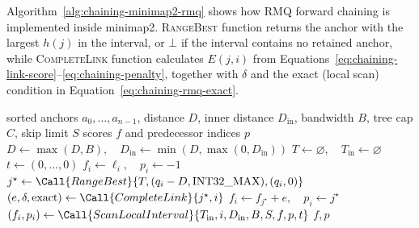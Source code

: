 Algorithm~\ref{alg:chaining-minimap2-rmq} shows how RMQ forward chaining is implemented inside minimap2.
\textsc{RangeBest} function returns the anchor with the largest \(h(j)\) in the
interval, or \(\bot\) if the interval contains no retained anchor, while \textsc{CompleteLink} function calculates \(E(j,i)\) from
Equations~\ref{eq:chaining-link-score}--\ref{eq:chaining-penalty}, together
with \(\delta\) and the exact (local scan) condition in
Equation~\ref{eq:chaining-rmq-exact}.

\begin{algorithm}[H]
\caption{Minimap2 RMQ forward chaining}
\label{alg:chaining-minimap2-rmq}
\footnotesize
\begin{algorithmic}[1]
  \Require sorted anchors \(a_0,\ldots,a_{n-1}\), distance \(D\),
    inner distance \(D_{\mathrm{in}}\), bandwidth \(B\), tree cap \(C\),
    skip limit \(S\)
  \Ensure scores \(f\) and predecessor indices \(p\)
    \State \(D\gets\max(D,B),\quad
      D_{\mathrm{in}}\gets\min(D,\max(0,D_{\mathrm{in}}))\)
    \State \(T\gets\varnothing,\quad T_{\mathrm{in}}\gets\varnothing\)
    \State \(t\gets(0,\ldots,0)\)
      \State {}
        \State {}
      \EndIf
      \State {}
        \State {}
      \EndIf
      \State \(f_i\gets\ell_i,\quad p_i\gets-1\)
      \State \(j^\star\gets
        \Call{RangeBest}{T,(q_i-D,\mathrm{INT32\_MAX}),(q_i,0)}\)
        \State \((e,\delta,\mathrm{exact})\gets
          \Call{CompleteLink}{j^\star,i}\)
          \State \(f_i\gets f_{j^\star}+e,\quad p_i\gets j^\star\)
        \EndIf
          \State \((f_i,p_i)\gets
            \Call{ScanLocalInterval}{T_{\mathrm{in}},i,D_{\mathrm{in}},B,S,f,p,t}\)
        \EndIf
      \EndIf
    \EndFor
    \State \Return \(f,p\)
  \EndFunction
\end{algorithmic}
\end{algorithm}

